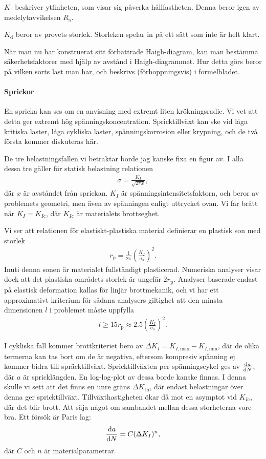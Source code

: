 $K_{\text{r}}$ beskriver ytfinheten, som visar sig påverka hållfastheten. Denna beror igen av medelytavvikelsen $R_{\text{a}}$.

$K_{\text{d}}$ beror av provets storlek. Storleken spelar in på ett sätt som inte är helt klart.

När man nu har konstruerat sitt förbättrade Haigh-diagram, kan man bestämma säkerhetsfaktorer med hjälp av avstånd i Haigh-diagrammet. Hur detta görs beror på vilken sorts last man har, och beskrivs (förhoppningsvis) i formelbladet.

\paragraph{Sprickor}
En spricka kan ses om en anvisning med extremt liten krökningsradie. Vi vet att detta ger extremt hög spänningskoncentration. Spricktillväxt kan ske vid låga kritiska laster, låga cykliska laster, spänningskorrosion eller krypning, och de två första kommer diskuteras här.

De tre belastningsfallen vi betraktar borde jag kanske fixa en figur av. I alla dessa tre gäller för statisk belastning relationen
\begin{align*}
 	\sigma = \frac{K_{I}}{\sqrt{2\pi x}},
\end{align*}
där $x$ är avståndet från sprickan. $K_{I}$ är spänningsintensitetsfaktorn, och beror av problemets geometri, men även av spänningen enligt uttrycket ovan. Vi får brått när $K_{I} = K_{I\text{c}}$, där $K_{I\text{c}}$ är materialets brottseghet.

Vi ser att relationen för elastiskt-plastiska material definierar en plastisk son med storlek
\begin{align*}
	r_{\text{p}} = \frac{1}{2\pi}\left(\frac{K_{I}}{\sigma_{\text{s}}}\right)^{2}.
\end{align*}
Inuti denna sonen är materialet fullständigt plasticerad. Numeriska analyser visar dock att det plastiska områdets storlek är ungefär $2r_{\text{p}}$. Analyser baserade endast på elastisk deformation kallas för linjär brottmekanik, och vi har ett approximativt kriterium för sådana analysers giltighet att den minsta dimensionen $l$ i problemet måste uppfylla
\begin{align*}
	l \geq 15r_{\text{p}} \approx 2.5\left(\frac{K_{I}}{\sigma_{\text{s}}}\right)^{2}.
\end{align*}

I cykliska fall kommer brottkriteriet bero av $\Delta K_{I} = K_{I,\text{max}} - K_{I,\text{min}}$, där de olika termerna kan tas bort om de är negativa, eftersom kompresiv spänning ej kommer bidra till spräcktillväxt. Spricktillväxten per spänningscykel ges av $\dv{a}{N}$, där $a$ är spricklängden. En log-log-plot av dessa borde kanske finnas. I denna skulle vi sett att det finns en unre gräns $\Delta K_{\text{th}}$, där endast belastningar över denna ger spricktillväxt. Tillväxthastigheten ökar då mot en asymptot vid $K_{I\text{c}}$, där det blir brott. Att säja något om sambandet mellan dessa storheterna vore bra. Ett försök är Paris lag:
\begin{align*}
	\dv{a}{N} = C(\Delta K_{I})^{n},
\end{align*}
där $C$ och $n$ är materialparametrar.